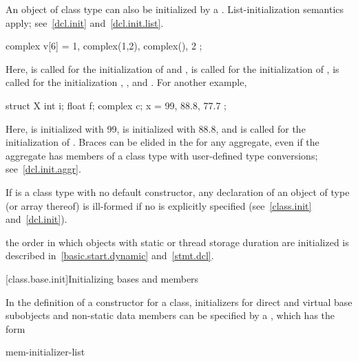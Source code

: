 \pnum
{}%
%
An object of class type can also be initialized by a
. List-initialization semantics apply;
see~\ref{dcl.init} and~\ref{dcl.init.list}. \enterexample

\begin{codeblock}
complex v[6] = { 1, complex(1,2), complex(), 2 };
\end{codeblock}

Here,
is called for the initialization of
and
,
is called for the initialization of
,
is called for the initialization
,
,
and
.
For another example,

\begin{codeblock}
struct X {
  int i;
  float f;
  complex c;
} x = { 99, 88.8, 77.7 };
\end{codeblock}

Here,
is initialized with 99,
is initialized with 88.8, and
is called for the initialization of
.
\exitexample
\enternote
Braces can be elided in the
for any aggregate, even if the aggregate has members of a class type with
user-defined type conversions; see~\ref{dcl.init.aggr}.
\exitnote

\pnum
\enternote
If
is a class type with no default constructor,
any declaration of an object of type
(or array thereof) is ill-formed if no
is explicitly specified (see~\ref{class.init} and~\ref{dcl.init}).
\exitnote

\pnum
\enternote
{}%
the order in which objects with static or thread storage duration
are initialized is described in~\ref{basic.start.dynamic} and~\ref{stmt.dcl}.
\exitnote

[class.base.init]{Initializing bases and members}%
%

\pnum
In the definition of a constructor for a class,
initializers for direct and virtual base subobjects and
non-static data members can be specified by a
,
which has the form

\begin{bnf}
\br
    \terminal{:} mem-initializer-list
\end{bnf}

